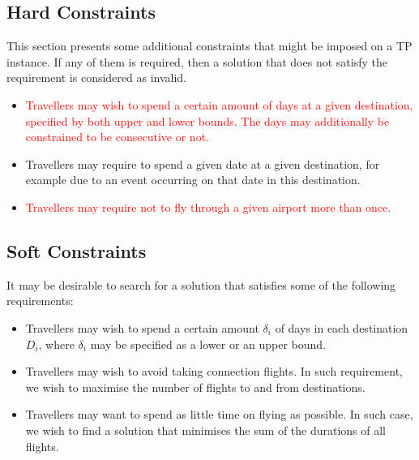 \documentclass{article}
\theoremstyle{definition}
\begin{document}
\subsection{Hard Constraints}
This section presents some additional constraints that might be imposed on a TP instance. If any of them is required, then a solution that does not satisfy the requirement is considered as invalid.

\begin{itemize}
\item \textcolor{red}{Travellers may wish to spend a certain amount of days at a given destination, specified by both upper and lower bounds. The days may additionally be constrained to be consecutive or not.}

\item Travellers may require to spend a given date at a given destination, for example due to an event occurring on that date in this destination.

\item \textcolor{red}{Travellers may require not to fly through a given airport more than once.}
\end{itemize}

\subsection{Soft Constraints}
It may be desirable to search for a solution that satisfies some of the following requirements:

\begin{itemize}
\item Travellers may wish to spend a certain amount $\delta_{i}$ of days in each destination $D_{i}$, where $\delta_{i}$ may be specified as a lower or an upper bound.

\item Travellers may wish to avoid taking connection flights. In such requirement, we wish to maximise the number of flights to and from destinations.

\item Travellers may want to spend as little time on flying as possible. In such case, we wish to find a solution that minimises the sum of the durations of all flights.
\end{itemize}
\end{document}
